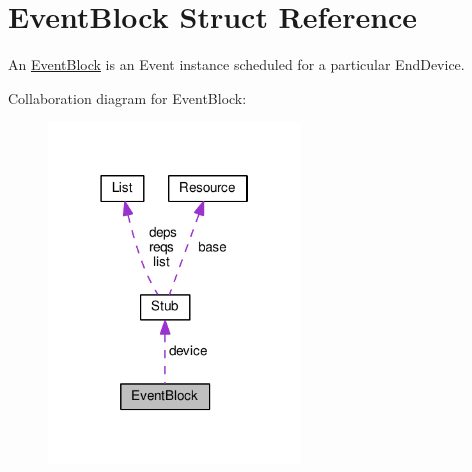 \hypertarget{structEventBlock}{}\section{Event\+Block Struct Reference}
\label{structEventBlock}


An \hyperlink{structEventBlock}{Event\+Block} is an Event instance scheduled for a particular End\+Device.  




Collaboration diagram for Event\+Block\+:\nopagebreak
\begin{figure}[H]
\begin{center}
\leavevmode
\includegraphics[width=190pt]{structEventBlock__coll__graph}
\end{center}
\end{figure}
